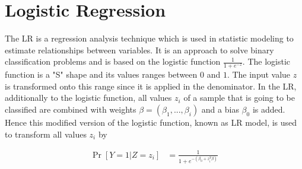 


\section{Logistic Regression}
\label{sec:lr}

The \acf{LR} is a regression analysis technique which is used in statistic modeling to estimate relationships between variables. %
It is an approach to solve binary classification problems and is based on the logistic function $\frac{1}{1 + e^{-z}}$.
The logistic function is a "S" shape and its values ranges between $0$ and $1$.
The input value $z$ is transformed onto this range since it is applied in the denominator.
In the \ac{LR}, additionally to the logistic function, all values $z_i$ of a sample that is going to be classified are combined with weights $\beta =(\beta_1, ..., \beta_i)$ and a bias $\beta_0$ is added.
Hence this modified version of the logistic function, known as \ac{LR} model, is used to transform all values $z_i$ by 

\begin{align*}
\Pr[Y = 1 | Z = z_i] &= \frac{1}{1 + e^{-(\beta_0 + z^T_i \beta)}}
\end{align*}


